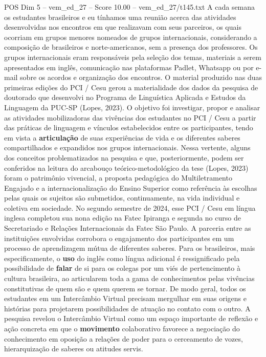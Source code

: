 \begin{textsample}{POS Dim 5 – vem\_ed\_27 – Score 10.00 – vem\_ed\_27/t145.txt}
A cada semana os estudantes brasileiros e eu tínhamos uma reunião acerca das atividades desenvolvidas nos encontros em que realizavam com seus parceiros, os quais ocorriam em grupos menores nomeados de grupos internacionais, considerando a composição de brasileiros e norte-americanos, sem a presença dos professores.
Os grupos internacionais eram responsáveis pela seleção dos temas, materiais a serem apresentados em inglês, comunicação nas plataformas Padlet, Whatsapp ou por e-mail sobre os acordos e organização dos encontros.
O material produzido nas duas primeiras edições do PCI / Cesu gerou a materialidade dos dados da pesquisa de doutorado que desenvolvi no Programa de Linguística Aplicada e Estudos da Linguagem da PUC-SP (Lopes, 2023).
O objetivo foi investigar, propor e analisar as atividades mobilizadoras das vivências dos estudantes no PCI / Cesu a partir das práticas de linguagem e vínculos estabelecidos entre os participantes, tendo em vista a \textbf{articulação} de suas experiências de vida e os diferentes saberes compartilhados e expandidos nos grupos internacionais.
Nessa vertente, alguns dos conceitos problematizados na pesquisa e que, posteriormente, podem ser conferidos na leitura do arcabouço teórico-metodológico da tese (Lopes, 2023) foram o patrimônio vivencial, a proposta pedagógica do Multiletramento Engajado e a internacionalização do Ensino Superior como referência às escolhas pelas quais os sujeitos são submetidos, continuamente, na vida individual e coletiva em sociedade.
No segundo semestre de 2024, esse PCI / Cesu em língua inglesa completou sua nona edição na Fatec Ipiranga e segunda no curso de Secretariado e Relações Internacionais da Fatec São Paulo.
A parceria entre as instituições envolvidas corrobora o engajamento dos participantes em um processo de aprendizagem mútua de diferentes saberes.
Para os brasileiros, mais especificamente, o \textbf{uso} do inglês como língua adicional é ressignificado pela possibilidade de \textbf{falar} de si para os colegas por um viés de pertencimento à cultura brasileira, ao articularem toda a gama de conhecimentos pelas vivências constitutivas de quem são e quem querem se tornar.
De modo geral, todos os estudantes em um Intercâmbio Virtual precisam mergulhar em suas origens e histórias para projetarem possibilidades de atuação no contato com o outro.
A pesquisa revelou o Intercâmbio Virtual como um espaço importante de reflexão e ação concreta em que o \textbf{movimento} colaborativo favorece a negociação do conhecimento em oposição a relações de poder para o cerceamento de vozes, hierarquização de saberes ou atitudes servis.

\end{textsample}
